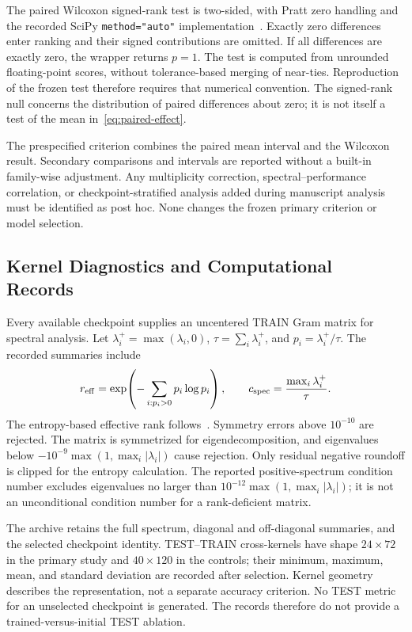 The paired Wilcoxon signed-rank test is two-sided, with Pratt zero handling and the recorded SciPy \texttt{method="auto"} implementation~\cite{wilcoxon1945ranking,pratt1959zeros}. Exactly zero differences enter ranking and their signed contributions are omitted. If all differences are exactly zero, the wrapper returns $p=1$. The test is computed from unrounded floating-point scores, without tolerance-based merging of near-ties. Reproduction of the frozen test therefore requires that numerical convention. The signed-rank null concerns the distribution of paired differences about zero; it is not itself a test of the mean in~\eqref{eq:paired-effect}.

The prespecified criterion combines the paired mean interval and the Wilcoxon result. Secondary comparisons and intervals are reported without a built-in family-wise adjustment. Any multiplicity correction, spectral--performance correlation, or checkpoint-stratified analysis added during manuscript analysis must be identified as post hoc. None changes the frozen primary criterion or model selection.

\subsection{Kernel Diagnostics and Computational Records}
\label{sec:methods-diagnostics}

Every available checkpoint supplies an uncentered TRAIN Gram matrix for spectral analysis. Let $\lambda_i^+=\max(\lambda_i,0)$, $\tau=\sum_i\lambda_i^+$, and $p_i=\lambda_i^+/\tau$. The recorded summaries include
\begin{equation}
 r_{\rm eff}=\exp\!\left(-\sum_{i:p_i>0}p_i\log p_i\right),
 \qquad c_{\rm spec}=\frac{\max_i\lambda_i^+}{\tau}.
 \label{eq:kernel-spectrum-diagnostics}
\end{equation}
The entropy-based effective rank follows~\cite{roy2007rank}. Symmetry errors above $10^{-10}$ are rejected. The matrix is symmetrized for eigendecomposition, and eigenvalues below $-10^{-9}\max(1,\max_i|\lambda_i|)$ cause rejection. Only residual negative roundoff is clipped for the entropy calculation. The reported positive-spectrum condition number excludes eigenvalues no larger than $10^{-12}\max(1,\max_i|\lambda_i|)$; it is not an unconditional condition number for a rank-deficient matrix.

The archive retains the full spectrum, diagonal and off-diagonal summaries, and the selected checkpoint identity. TEST--TRAIN cross-kernels have shape $24\times72$ in the primary study and $40\times120$ in the controls; their minimum, maximum, mean, and standard deviation are recorded after selection. Kernel geometry describes the representation, not a separate accuracy criterion. No TEST metric for an unselected checkpoint is generated. The records therefore do not provide a trained-versus-initial TEST ablation.

